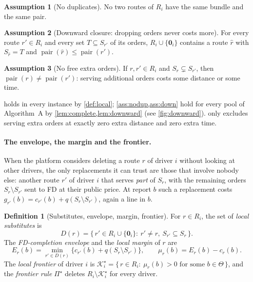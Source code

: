 \documentclass[11pt]{article}
\theoremstyle{definition}
\newtheorem{definition}{Definition}
\newtheorem{assumption}{Assumption}
\theoremstyle{remark}
\newcommand{\Ks}{\mathcal{K}^{\star}}
\newcommand{\idle}{\mathbf{0}}
\newcommand{\pair}{\operatorname{pair}}
\begin{document}
\begin{assumption}[No duplicates]\label{ass:nodup}
No two routes of $R_i$ have the same bundle and the same pair.
\end{assumption}

\begin{assumption}[Downward closure: dropping orders never costs more]\label{ass:down}
For every route $r'\in R_i$ and every set $T\subseteq S_{r'}$ of its orders,
$R_i\cup\{\idle_i\}$ contains a route $\hat r$ with $S_{\hat r}=T$ and
$\pair(\hat r)\le\pair(r')$.
\end{assumption}

\begin{assumption}[No free extra orders]\label{ass:nofree}
If $r,r'\in R_i$ and $S_r\subsetneq S_{r'}$, then $\pair(r)\ne\pair(r')$:
serving additional orders costs some distance or some time.
\end{assumption}

 holds in every instance by \cref{def:local};
\cref{ass:nodup,ass:down} hold for every pool of Algorithm~A by
\cref{lem:complete,lem:downward} (see \cref{fig:downward}).
 only excludes serving extra orders at exactly zero extra
distance and zero extra time.

\paragraph{The envelope, the margin and the frontier.}
When the platform considers deleting a route $r$ of driver $i$ without looking
at other drivers, the only replacements it can trust are those that involve
nobody else: another route $r'$ of driver $i$ that serves \emph{part} of $S_r$,
with the remaining orders $S_r\setminus S_{r'}$ sent to FD at their public
price. At report $b$ such a replacement costs
$g_{r'}(b)=c_{r'}(b)+q(S_r\setminus S_{r'})$, again a line in $b$.

\begin{definition}[Substitutes, envelope, margin, frontier]\label{def:frontier}
For $r\in R_i$, the set of \emph{local substitutes} is
\[
D(r)=\bigl\{\,r'\in R_i\cup\{\idle_i\}:\ r'\ne r,\ S_{r'}\subseteq S_r\,\bigr\}.
\]
The \emph{FD-completion envelope} and the \emph{local margin} of $r$ are
\[
E_r(b)=\min_{r'\in D(r)}\bigl\{c_{r'}(b)+q(S_r\setminus S_{r'})\bigr\},
\qquad
\mu_r(b)=E_r(b)-c_r(b).
\]
The \emph{local frontier} of driver $i$ is
$\Ks_i=\{\,r\in R_i:\ \mu_r(b)>0\text{ for some }b\in\Theta\,\}$, and the
\emph{frontier rule} $\Pi^\star$ deletes $R_i\setminus\Ks_i$ for every driver.
\end{definition}
\end{document}
